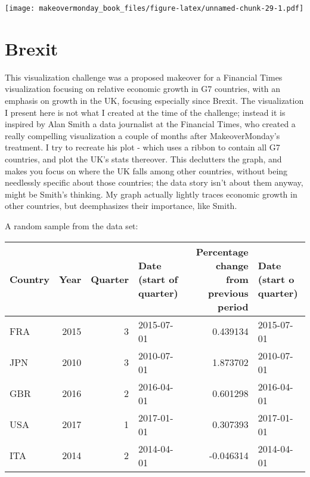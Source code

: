 \documentclass[]{book}
\theoremstyle{definition}
\theoremstyle{definition}
\theoremstyle{definition}
\theoremstyle{remark}
\begin{document}
\texttt{[image: makeovermonday\_book\_files/figure-latex/unnamed-chunk-29-1.pdf]}

\chapter{Brexit}\label{brexit}

This visualization challenge was a proposed makeover for a Financial
Times visualization focusing on relative economic growth in G7
countries, with an emphasis on growth in the UK, focusing especially
since Brexit. The visualization I present here is not what I created at
the time of the challenge; instead it is inspired by Alan Smith a data
journalist at the Financial Times, who created a really compelling
visualization a couple of months after MakeoverMonday's treatment. I try
to recreate his plot - which uses a ribbon to contain all G7 countries,
and plot the UK's stats thereover. This declutters the graph, and makes
you focus on where the UK falls among other countries, without being
needlessly specific about those countries; the data story isn't about
them anyway, might be Smith's thinking. My graph actually lightly traces
economic growth in other countries, but deemphasizes their importance,
like Smith.

A random sample from the data set:

\begin{tabular}{l|r|r|l|r|l}
\hline
Country & Year & Quarter & Date (start of quarter) & Percentage change from previous period & Date (start o quarter)\\
\hline
FRA & 2015 & 3 & 2015-07-01 & 0.439134 & 2015-07-01\\
\hline
JPN & 2010 & 3 & 2010-07-01 & 1.873702 & 2010-07-01\\
\hline
GBR & 2016 & 2 & 2016-04-01 & 0.601298 & 2016-04-01\\
\hline
USA & 2017 & 1 & 2017-01-01 & 0.307393 & 2017-01-01\\
\hline
ITA & 2014 & 2 & 2014-04-01 & -0.046314 & 2014-04-01\\
\hline
\end{tabular}
\end{document}
